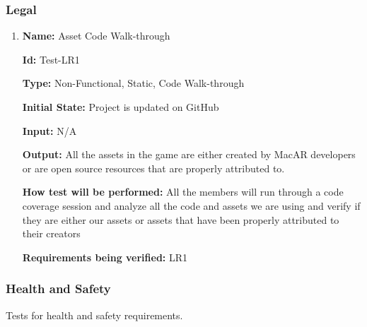 \documentclass[12pt, titlepage]{article}
\begin{document}
\subsubsection{Legal}

\begin{enumerate}

\item{\textbf{Name:} Asset Code Walk-through} \label{itm:Test-LR1}

\textbf{Id:} Test-LR1

\textbf{Type:} Non-Functional, Static, Code Walk-through
					
\textbf{Initial State:} Project is updated on GitHub
					
\textbf{Input:} N/A
					
\textbf{Output:} All the assets in the game are either created by MacAR developers or are open source resources that are properly attributed to. 
					
\textbf{How test will be performed:} All the members will run through a code coverage session and analyze all the code and assets we are using and verify if they are either our assets or assets that have been properly attributed to their creators

\textbf{Requirements being verified:} LR1
					
\end{enumerate}

\subsubsection{Health and Safety}
Tests for health and safety requirements. 
\end{document}

